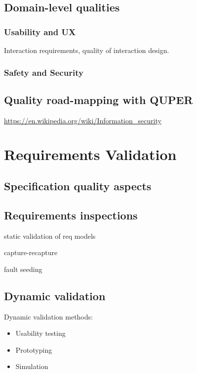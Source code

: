 \documentclass{reqengbook}
\begin{document}
\section{Domain-level qualities}

\subsection{Usability and UX}

Interaction requirements, quality of interaction design.

\subsection{Safety and Security}

\section{Quality road-mapping with QUPER}



\url{https://en.wikipedia.org/wiki/Information_security}


\chapter{Requirements Validation}

\section{Specification quality aspects}


\section{Requirements inspections}
static validation of req models

capture-recapture

fault seeding

\section{Dynamic validation}

Dynamic validation methods:
\begin{itemize}
  \item Usability testing
  \item Prototyping
  \item Simulation
\end{itemize}
\end{document}
